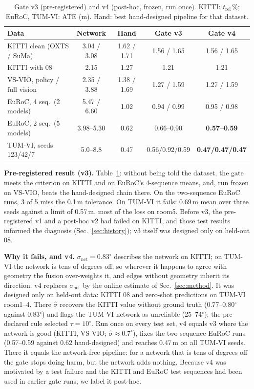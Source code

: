 \documentclass[letterpaper,journal]{IEEEtran}
\begin{document}
\begin{table}[t]
\caption{Gate v3 (pre-registered) and v4 (post-hoc, frozen, run once). KITTI: $t_\mathrm{rel}$\,\%; EuRoC, TUM-VI: ATE (m). Hand: best hand-designed pipeline for that dataset.}
\label{tab:gate}
\centering\small
\setlength{\tabcolsep}{8pt}
\begin{tabular}{@{}lcccc@{}}
\toprule
Data & Network & Hand & Gate v3 & Gate v4 \\
\midrule
KITTI clean (OXTS / SuMa) & 3.04 / 3.08 & 1.62 / 1.71 & 1.56 / 1.65 & 1.56 / 1.65 \\
KITTI with 08 & 2.15 & 1.27 & 1.21 & 1.21 \\
VS-VIO, policy / full vision & 2.35 / 3.88 & 1.38 / 1.69 & 1.27 / 1.59 & 1.27 / 1.59 \\
EuRoC, 4 seq.\ (2 models) & 5.47 / 6.60 & 1.02 & 0.94 / 0.99 & 0.95 / 0.98 \\
EuRoC, 2 seq.\ (5 models) & 3.98--5.30 & 0.62 & 0.66--0.90 & \textbf{0.57--0.59} \\
TUM-VI, seeds 123/42/7 & 5.0--8.8 & 0.47 & 0.56/0.92/0.59 & \textbf{0.47/0.47/0.47} \\
\bottomrule
\end{tabular}
\end{table}

\textbf{Pre-registered result (v3).} Table~\ref{tab:gate}: without being told the dataset, the gate meets the criterion on KITTI and on EuRoC's 4-sequence means, and, run frozen on VS-VIO, beats the hand-designed chain there. On the two-sequence EuRoC runs, 3 of 5 miss the 0.1\,m tolerance. On TUM-VI it fails: 0.69\,m mean over three seeds against a limit of 0.57\,m, most of the loss on room5. Before v3, the pre-registered v1 and a post-hoc v2 had failed on KITTI, and those test results informed the diagnosis (Sec.~\ref{sec:history}); v3 itself was designed only on held-out 08.

\textbf{Why it fails, and v4.} $\sigma_{\mathrm{net}}=0.83^\circ$ describes the network on KITTI; on TUM-VI the network is tens of degrees off, so wherever it happens to agree with geometry the fusion over-weights it, and edges without geometry inherit its direction. v4 replaces $\sigma_{\mathrm{net}}$ by the online estimate of Sec.~\ref{sec:method}. It was designed only on held-out data: KITTI 08 and zero-shot predictions on TUM-VI room1--4. There $\hat\sigma$ recovers the KITTI value without ground truth (0.77--0.80$^\circ$ against 0.83$^\circ$) and flags the TUM-VI network as unreliable (25--74$^\circ$); the pre-declared rule selected $\tau=10^\circ$. Run once on every test set, v4 equals v3 where the network is good (KITTI, VS-VIO; $\hat\sigma\approx0.7^\circ$), fixes the two-sequence EuRoC runs (0.57--0.59 against 0.62 hand-designed) and reaches 0.47\,m on all TUM-VI seeds. There it equals the network-free pipeline: for a network that is tens of degrees off the gate stops doing harm, but the network adds nothing. Because v4 was motivated by a test failure and the KITTI and EuRoC test sequences had been used in earlier gate runs, we label it post-hoc.
\end{document}
